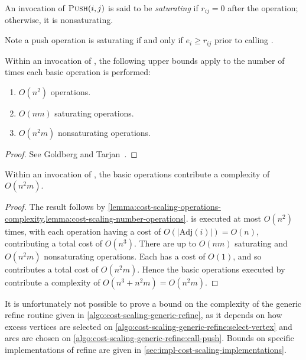 \begin{defn}
An invocation of $\textproc{Push}(i,j)$ is said to be \emph{saturating} if $r_{ij} = 0$ after the operation; otherwise, it is nonsaturating.
\end{defn}

\begin{remark}
Note a push operation is saturating if and only if $e_i \geq r_{ij}$ prior to calling .\\
\end{remark}

\begin{lemma} \label{lemma:cost-scaling-number-operations}
Within an invocation of , the following upper bounds apply to the number of times each basic operation is performed:
\begin{enumerate}[label=(\alph*)]
    \item $O(n^2)$  operations.
    \item $O(nm)$ saturating  operations.
    \item $O(n^2m)$ nonsaturating  operations.
\end{enumerate}
\end{lemma}
\begin{proof}
See Goldberg and Tarjan~\cite[lemma~6.3, lemma~6.4, lemma~6.7]{Goldberg:1987}.
\end{proof}

\begin{thm} \label{thm:cost-scaling-refine-complexity}
Within an invocation of , the basic operations contribute a complexity of $O(n^2m)$.
\end{thm}
\begin{proof}
The result follows by \cref{lemma:cost-scaling-operations-complexity,lemma:cost-scaling-number-operations}.  is executed at most $O(n^2)$ times, with each operation having a cost of $O\left(\left|\mathrm{Adj}(i)\right|\right) = O(n)$, contributing a total cost of $O(n^3)$. There are up to $O(nm)$ saturating and $O(n^2m)$ nonsaturating  operations. Each has a cost of $O(1)$, and so  contributes a total cost of $O(n^2m)$. Hence the basic operations executed by  contribute a complexity of $O(n^3 + n^2m) = O(n^2m)$.
\end{proof}

\begin{remark}
It is unfortunately not possible to prove a bound on the complexity of the generic refine routine given in \cref{algo:cost-scaling-generic-refine}, as it depends on how excess vertices are selected on \cref{algo:cost-scaling-generic-refine:select-vertex} and arcs are chosen on \cref{algo:cost-scaling-generic-refine:call-push}. Bounds on specific implementations of refine are given in \cref{sec:impl-cost-scaling-implementations}.\\
\end{remark}

